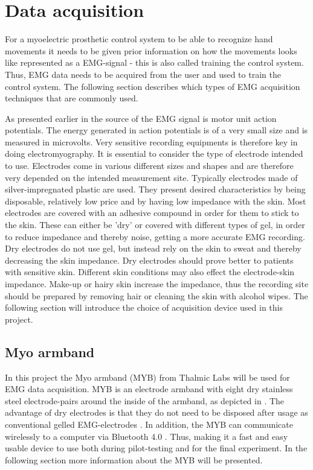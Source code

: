 \section{Data acquisition} \label{sec:BG:dataAcquisition}
For a myoelectric prosthetic control system to be able to recognize hand movements it needs to be given prior information on how the movements looks like represented as a EMG-signal - this is also called training the control system. Thus, EMG data needs to be acquired from the user and used to train the control system. The following section describes which types of EMG acquisition techniques that are commonly used.

As presented earlier in  the source of the EMG signal is motor unit action potentials. The energy generated in action potentials is of a very small size and is measured in microvolts. Very sensitive recording equipments is therefore key in doing electromyography. It is essential to consider the type of electrode intended to use. Electrodes come in various different sizes and shapes and are therefore very depended on the intended measurement site. Typically electrodes made of silver-impregnated plastic are used. They present desired characteristics by being disposable, relatively low price and by having low impedance with the skin. Most electrodes are covered with an adhesive compound in order for them to stick to the skin. These can either be 'dry' or covered with different types of gel, in order to reduce impedance and thereby noise, getting a more accurate EMG recording. Dry electrodes do not use gel, but instead rely on the skin to sweat and thereby decreasing the skin impedance. Dry electrodes should prove better to patients with sensitive skin. Different skin conditions may also effect the electrode-skin impedance. Make-up or hairy skin increase the impedance, thus the recording site should be prepared by removing hair or cleaning the skin with alcohol wipes. \cite{Cram2012} The following section will introduce the choice of acquisition device used in this project.

\subsection{Myo armband} \label{sub:BG:MYB}
In this project the Myo armband (MYB) from Thalmic Labs will be used for EMG data acquisition. MYB is an electrode armband with eight dry stainless steel electrode-pairs around the inside of the armband, as depicted in . The advantage of dry electrodes is that they do not need to be disposed after usage as conventional gelled EMG-electrodes \cite{Cram2012}. In addition, the MYB can communicate wirelessly to a computer via Bluetooth 4.0 \cite{Myoarmband2013}. Thus, making it a fast and easy usable device to use both during pilot-testing and for the final experiment. In the following section more information about the MYB will be presented.

